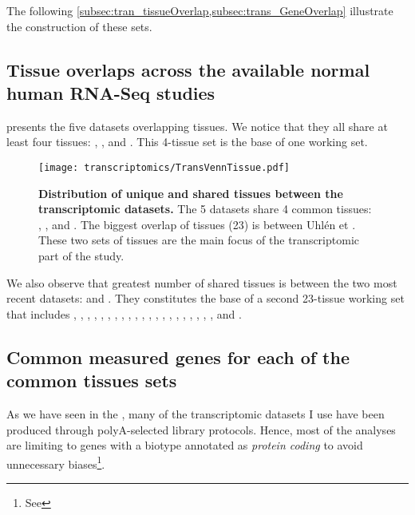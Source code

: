 The following \cref{subsec:tran_tissueOverlap,subsec:trans_GeneOverlap}
illustrate the construction of these sets.

\subsection{Tissue overlaps across the available normal human RNA-Seq studies}
\label{subsec:tran_tissueOverlap}

 presents the five datasets overlapping tissues.
We notice that they all share at least four tissues:
, ,  and .
This 4-tissue set is the base of one working set.

\begin{figure}[h]%
\texttt{[image: transcriptomics/TransVennTissue.pdf]}\centering
\caption[Distribution of unique and shared tissues between the
transcriptomic datasets]
{\label{fig:VennStudiesT}\textbf{Distribution of unique and shared tissues
between the transcriptomic datasets.} The 5 datasets share 4
common tissues: , ,  and
.
The biggest overlap of tissues (23) is between Uhlén et \Gtex.
These two sets of tissues are the main focus of the transcriptomic part of the
study.}
\end{figure}

We also observe that greatest number of shared tissues is
between the two most recent datasets:
 and .
They constitutes the base of a second 23-tissue working set that includes
, , ,
, , ,
, , , ,
, , , ,
, , ,
, , , ,
 and .

\subsection{Common measured genes for each of the common tissues sets}
\label{subsec:trans_GeneOverlap}
As we have seen in the ,
many of the transcriptomic datasets I use have been produced through
polyA-selected library protocols.
Hence, most of the analyses are limiting to genes with a biotype annotated as
\emph{protein coding}
to avoid unnecessary biases\footnote{See }.

